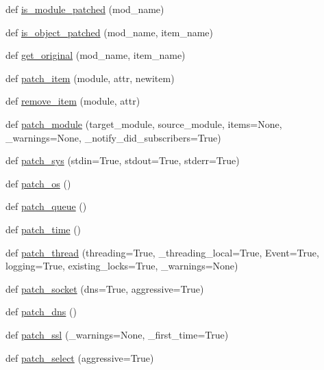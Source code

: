 \begin{DoxyCompactItemize}
\item 
def \hyperlink{namespacegevent_1_1monkey_aaaa4854f7592d3709914701abaf3049c}{is\+\_\+module\+\_\+patched} (mod\+\_\+name)
\item 
def \hyperlink{namespacegevent_1_1monkey_a0fa2edf73aebcd8f4ce9d2f90fdb7156}{is\+\_\+object\+\_\+patched} (mod\+\_\+name, item\+\_\+name)
\item 
def \hyperlink{namespacegevent_1_1monkey_a3128c39309cb9a10ee47a0307ac36b10}{get\+\_\+original} (mod\+\_\+name, item\+\_\+name)
\item 
def \hyperlink{namespacegevent_1_1monkey_a427173356bbfbfe80987e3b28e4b1b58}{patch\+\_\+item} (module, attr, newitem)
\item 
def \hyperlink{namespacegevent_1_1monkey_a56d7bc7df5444f3776834dfc73450ac1}{remove\+\_\+item} (module, attr)
\item 
def \hyperlink{namespacegevent_1_1monkey_ad3b37abeb612c38561500a824c0e7f1c}{patch\+\_\+module} (target\+\_\+module, source\+\_\+module, items=None, \+\_\+warnings=None, \+\_\+notify\+\_\+did\+\_\+subscribers=True)
\item 
def \hyperlink{namespacegevent_1_1monkey_aeb8b7b80a2732e697d59550acfdca3d7}{patch\+\_\+sys} (stdin=True, stdout=True, stderr=True)
\item 
def \hyperlink{namespacegevent_1_1monkey_ae0d897ace1d55978c5bdbcf59e963de3}{patch\+\_\+os} ()
\item 
def \hyperlink{namespacegevent_1_1monkey_a98bfba3bfb9f774f0a3480940d491f26}{patch\+\_\+queue} ()
\item 
def \hyperlink{namespacegevent_1_1monkey_a28161e4e18de4aa37ea67c6844f46b8d}{patch\+\_\+time} ()
\item 
def \hyperlink{namespacegevent_1_1monkey_a922c34edbe660ed3786aeabcced05e13}{patch\+\_\+thread} (threading=True, \+\_\+threading\+\_\+local=True, Event=True, logging=True, existing\+\_\+locks=True, \+\_\+warnings=None)
\item 
def \hyperlink{namespacegevent_1_1monkey_a788700ce9056db65b14e84481718e87c}{patch\+\_\+socket} (dns=True, aggressive=True)
\item 
def \hyperlink{namespacegevent_1_1monkey_a7de4a05d2bb76f083f3389ee774e5d09}{patch\+\_\+dns} ()
\item 
def \hyperlink{namespacegevent_1_1monkey_a7e519f075b2b4d2f3e62ca378b9ab966}{patch\+\_\+ssl} (\+\_\+warnings=None, \+\_\+first\+\_\+time=True)
\item 
def \hyperlink{namespacegevent_1_1monkey_a5307838fbb23c93e4f6d59c180738969}{patch\+\_\+select} (aggressive=True)

\end{DoxyCompactItemize}
